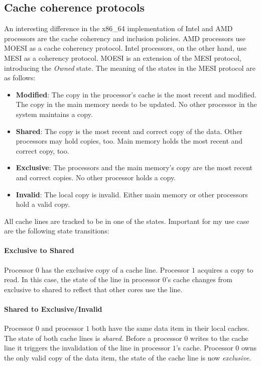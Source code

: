 \subsection{Cache coherence protocols}
\label{sec:state:technical:caches_protocol}
An interesting difference in the x86\_64 implementation of Intel and AMD
processors are the cache coherency and inclusion policies. AMD processors use
MOESI as a cache coherency protocol.\cite{amd_manual} Intel processors, on the
other hand, use MESI as a coherency protocol.\cite{intel_sdm} MOESI is an
extension of the MESI protocol, introducing the \textit{Owned} state. The
meaning of the states in the MESI protocol are as follows:
\begin{itemize}
    \item \textbf{Modified}: The copy in the processor's cache is the most
          recent and modified. The copy in the main memory needs to be updated.
          No other processor in the system maintains a copy.
    \item \textbf{Shared}:  The copy is the most recent and correct copy of the
          data. Other processors may hold copies, too. Main memory holds the
          most recent and correct copy, too.
    \item \textbf{Exclusive}: The processors and the main memory's copy are the
          most recent and correct copies. No other processor holds a copy.
    \item \textbf{Invalid}: The local copy is invalid. Either main memory or
          other processors hold a valid copy.
\end{itemize}
All cache lines are tracked to be in one of the states. Important for my use
case are the following state transitions:

\paragraph{Exclusive to Shared}
Processor $0$ has the exclusive copy of a cache line. Processor $1$ acquires a
copy to read. In this case, the state of the line in processor $0$'s
cache changes from exclusive to shared to reflect that other cores use the line.

\paragraph{Shared to Exclusive/Invalid}
Processor $0$ and processor $1$ both have the same data item in their local
caches. The state of both cache lines is \textit{shared}. Before a  processor
$0$ writes to the cache line it triggers the invalidation of the line in
processor $1$'s cache. Processor $0$ owns the only valid copy of the data item,
the state of the cache line is now \textit{exclusive}.

